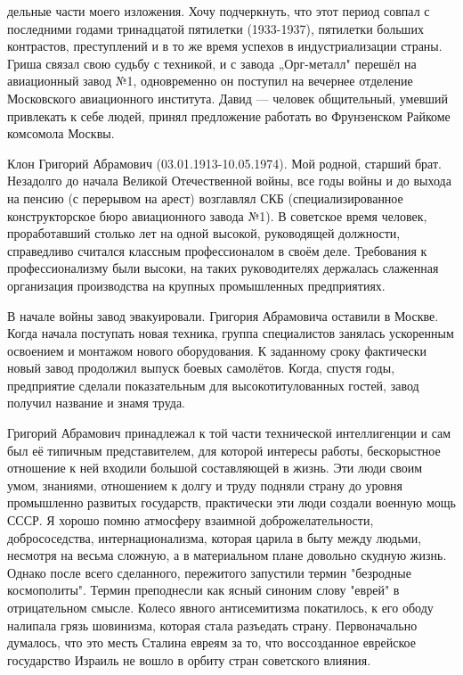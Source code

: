 \label{167-1}
дельные части моего изложения. Хочу подчеркнуть, что этот период совпал с последними годами тринадцатой пятилетки (1933-1937), пятилетки больших контрастов, преступлений и в то же время успехов в индустриализации страны. Гриша связал свою судьбу с техникой, и с завода „Орг-металл" перешёл на авиационный завод №1, одновременно он поступил на вечернее отделение Московского авиационного института. Давид — человек общительный, умевший привлекать к себе людей, принял предложение работать во Фрунзенском Райкоме комсомола Москвы.

Клон Григорий Абрамович (03.01.1913-10.05.1974). Мой родной, старший брат. Незадолго до начала Великой Отечественной войны, все годы войны и до выхода на пенсию (с перерывом на арест) возглавлял СКБ (специализированное конструкторское бюро авиационного завода №1). В советское время человек, проработавший столько лет на одной высокой, руководящей должности, справедливо считался классным профессионалом в своём деле. Требования к профессионализму были высоки, на таких руководителях держалась слаженная организация производства на крупных промышленных предприятиях.

\label{168-1}
В начале войны завод эвакуировали. Григория Абрамовича оставили в Москве. Когда начала поступать новая техника, группа специалистов занялась ускоренным освоением и монтажом нового оборудования. К заданному сроку фактически новый завод продолжил выпуск боевых самолётов. Когда, спустя годы, предприятие сделали показательным для высокотитулованных гостей, завод получил название и знамя труда.

Григорий Абрамович принадлежал к той части технической интеллигенции и сам был её типичным представителем, для которой интересы работы, бескорыстное отношение к ней входили большой составляющей в жизнь. Эти люди своим умом, знаниями, отношением к долгу и труду подняли страну до уровня промышленно развитых государств, практически эти люди создали военную мощь СССР. Я хорошо помню атмосферу взаимной доброжелательности, добрососедства, интернационализма, которая царила в быту между людьми, несмотря на весьма сложную, а в материальном плане довольно скудную жизнь. Однако после всего сделанного, пережитого запустили термин "безродные космополиты". Термин преподнесли как ясный синоним слову "еврей" в отрицательном смысле. Колесо явного антисемитизма покатилось, к его ободу налипала грязь шовинизма, которая стала разъедать страну. Первоначально думалось, что это месть Сталина евреям за то, что воссозданное еврейское государство Израиль не вошло в орбиту стран советского влияния.


